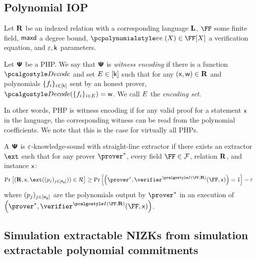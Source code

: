 \documentclass[runningheads,11pt]{llncs}
\begin{document}
\subsection{Polynomial IOP}
\begin{definition}
  \label{def:php}
  Let $\mathbf{R}$ be an indexed relation with a corresponding language $\mathbf{L}$, $\FF$
  some finite field, $\mathsf{maxd}$ a degree bound, $\vereq_{\cdot}(X) \in \FF[X]$ a
  verification equation, and $\varepsilon, \mathsf{k}$ parameters.
\end{definition}

\begin{definition}
  \label{def:wephp}
  Let $\bm{\mathsf{\Psi}}$ be a PHP.  We say that $\bm{\mathsf{\Psi}}$ is \emph{witness encoding} if there is
  a function $\decode$ and set $E \in [\mathsf{k}]$ such that for any
  $(\mathsf{x}, \mathsf{w}) \in \mathbf{R}$ and polynomials $\{f_i\}_{i \in [\mathsf{k}]}$ sent by an
  honest prover, $\decode(\smallset{f_i}_{i \in \encset}) = \wit$. We call $E$ the
  \emph{encoding set}.
\end{definition}
In other words, PHP is witness encoding if for any valid proof for a statement
$\mathsf{x}$ in the language, the corresponding witness can be read from the
polynomial coefficients. We note that this is the case for virtually all
PHPs. 

\begin{definition}
\label{def:knownsound_wc_poly}
A $\bm{\mathsf{\Psi}}$ is $\varepsilon$-knowledge-sound with straight-line extractor if there exists an
extractor $\ext$ such that for any prover $\prover^*$, every field $\FF \in \Fam$,
relation $\mathbf{R}$, and instance $\mathsf{x}$: 
\[ \Prob{ (\REL, \inp, \ext(\tuple\pora{\nprv})) \in \RELGEN}
	\geq \Prob{ \brak{ \prover^*,\verifier^{\indexer(\FF, \REL)}(\FF, \inp) } = 1} - \eps
\]
where $(p_j)_{j \in [\mathsf{n_p}]}$ are the polynomials output by $\prover^*$ in an execution of
$\brak{\prover^*, \verifier^{\indexer(\FF, \REL)}(\FF, \inp)}$.
\end{definition}



\subsection{Simulation extractable NIZKs from simulation extractable polynomial
  commitments}
\end{document}

